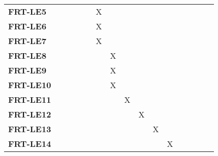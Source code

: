 \documentclass[12pt, titlepage]{article}
\begin{document}
\begin{landscape}
\begin{longtable}{|l|cccccccccccc|}
  \textbf{FRT-LE5}  & ~              & ~              & ~              & X              & ~              & ~              & ~              & ~              & ~              & ~              & ~               & ~              \\
  \textbf{FRT-LE6}  & ~              & ~              & ~              & X              & ~              & ~              & ~              & ~              & ~              & ~              & ~               & ~              \\
  \textbf{FRT-LE7}  & ~              & ~              & ~              & X              & ~              & ~              & ~              & ~              & ~              & ~              & ~               & ~              \\
  \textbf{FRT-LE8}  & ~              & ~              & ~              & ~              & X              & ~              & ~              & ~              & ~              & ~              & ~               & ~              \\
  \textbf{FRT-LE9}  & ~              & ~              & ~              & ~              & X              & ~              & ~              & ~              & ~              & ~              & ~               & ~              \\
  \textbf{FRT-LE10} & ~              & ~              & ~              & ~              & X              & ~              & ~              & ~              & ~              & ~              & ~               & ~              \\
  \textbf{FRT-LE11} & ~              & ~              & ~              & ~              & ~              & X              & ~              & ~              & ~              & ~              & ~               & ~              \\
  \textbf{FRT-LE12} & ~              & ~              & ~              & ~              & ~              & ~              & X              & ~              & ~              & ~              & ~               & ~              \\
  \textbf{FRT-LE13} & ~              & ~              & ~              & ~              & ~              & ~              & ~              & X              & ~              & ~              & ~               & ~              \\
  \textbf{FRT-LE14} & ~              & ~              & ~              & ~              & ~              & ~              & ~              & ~              & X              & ~              & ~               & ~              \\

\end{longtable}
\end{landscape}
\end{document}
